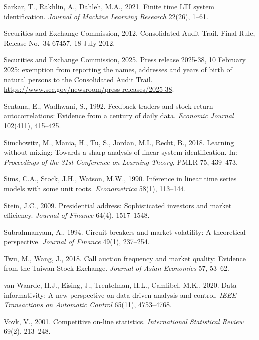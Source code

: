 \documentclass[11pt,letterpaper]{article}
\theoremstyle{definition}
\begin{document}
\begin{list}{}{\footnotesize\linespread{0.89}\selectfont\setlength{\leftmargin}{1.3em}\setlength{\itemindent}{-1.8em}\setlength{\itemsep}{0pt}\setlength{\parsep}{0pt}}
\item Sarkar, T., Rakhlin, A., Dahleh, M.A., 2021. Finite time LTI system identification. \emph{Journal of Machine Learning Research} 22(26), 1--61.

\item Securities and Exchange Commission, 2012. Consolidated Audit Trail. Final Rule, Release No.\ 34-67457, 18 July 2012.

\item Securities and Exchange Commission, 2025. Press release 2025-38, 10 February 2025: exemption from reporting the names, addresses and years of birth of natural persons to the Consolidated Audit Trail. \url{https://www.sec.gov/newsroom/press-releases/2025-38}.

\item Sentana, E., Wadhwani, S., 1992. Feedback traders and stock return autocorrelations: Evidence from a century of daily data. \emph{Economic Journal} 102(411), 415--425.

\item Simchowitz, M., Mania, H., Tu, S., Jordan, M.I., Recht, B., 2018. Learning without mixing: Towards a sharp analysis of linear system identification. In: \emph{Proceedings of the 31st Conference on Learning Theory}, PMLR 75, 439--473.

\item Sims, C.A., Stock, J.H., Watson, M.W., 1990. Inference in linear time series models with some unit roots. \emph{Econometrica} 58(1), 113--144.

\item Stein, J.C., 2009. Presidential address: Sophisticated investors and market efficiency. \emph{Journal of Finance} 64(4), 1517--1548.

\item Subrahmanyam, A., 1994. Circuit breakers and market volatility: A theoretical perspective. \emph{Journal of Finance} 49(1), 237--254.

\item Twu, M., Wang, J., 2018. Call auction frequency and market quality: Evidence from the Taiwan Stock Exchange. \emph{Journal of Asian Economics} 57, 53--62.

\item van Waarde, H.J., Eising, J., Trentelman, H.L., Camlibel, M.K., 2020. Data informativity: A new perspective on data-driven analysis and control. \emph{IEEE Transactions on Automatic Control} 65(11), 4753--4768.

\item Vovk, V., 2001. Competitive on-line statistics. \emph{International Statistical Review} 69(2), 213--248.


\end{list}
\end{document}
